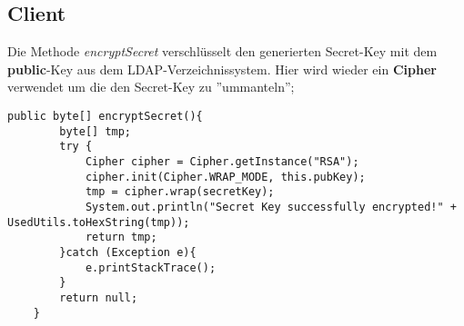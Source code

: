 \subsection{Client}

Die Methode \textit{encryptSecret} verschlüsselt den generierten Secret-Key mit dem \textbf{public}-Key aus dem LDAP-Verzeichnissystem. Hier wird wieder ein \textbf{Cipher} verwendet um die den Secret-Key zu ''ummanteln'';

\begin{lstlisting}[style=Java, caption= SecretKey encrypting on Client-Side]
    public byte[] encryptSecret(){
	    byte[] tmp;
	    try {
		    Cipher cipher = Cipher.getInstance("RSA");
		    cipher.init(Cipher.WRAP_MODE, this.pubKey);
			tmp = cipher.wrap(secretKey);
		    System.out.println("Secret Key successfully encrypted!" + UsedUtils.toHexString(tmp));
		    return tmp;
		}catch (Exception e){
		    e.printStackTrace();
	    }
	    return null;
    }
\end{lstlisting}






